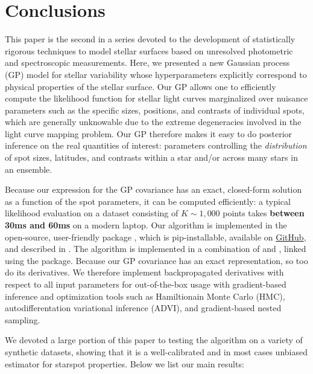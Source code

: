 \documentclass[modern,linenumbers]{aastex62}
\newcommand{\edited}[1]{\textbf{#1}}
\begin{document}
\section{Conclusions}
\label{sec:conclusions}

This paper is the second in a series devoted to the development of
statistically rigorous techniques to model stellar surfaces based on
unresolved photometric and spectroscopic measurements.
%
Here, we presented a new Gaussian process (GP) model for stellar variability
whose hyperparameters explicitly correspond to physical properties of the stellar
surface. Our GP allows one to efficiently compute the likelihood function
for stellar light curves
marginalized over nuisance parameters such as the specific sizes,
positions, and contrasts of individual spots,
which are generally unknowable due to the extreme degeneracies
involved in the light curve mapping problem. Our GP therefore
makes it easy to
do posterior inference on the real quantities of interest: parameters
controlling the \emph{distribution} of spot sizes, latitudes, and
contrasts within a star and/or across many stars in an ensemble.

Because our expression for the GP covariance has an exact, closed-form
solution as a function of the spot parameters, it can be computed
efficiently: a typical likelihood evaluation on a dataset
consisting of $K \sim 1{,}000$ points takes \edited{between 30ms and 60ms} on a modern
laptop. Our algorithm is implemented in the open-source, user-friendly
\Python package \starryprocess, which is \textsf{pip}-installable, available on
\href{https://github.com/rodluger/starry_process}{GitHub}, and
described in \citet{JOSSPaper}.
The algorithm is implemented in a combination of \cpp and \Python,
linked using the \theano package. Because our GP covariance has an exact
representation, so too do its derivatives. We therefore implement
backpropagated derivatives with respect to all input parameters for
out-of-the-box usage with gradient-based inference and optimization
tools such as Hamiltionain Monte Carlo (HMC), autodifferentation
variational inference (ADVI), and gradient-based nested sampling.

We devoted a large portion of this paper to testing the algorithm on a variety
of synthetic datasets, showing that it is a well-calibrated and in most
cases unbiased estimator for starspot properties. Below we list our main
results:
\end{document}
